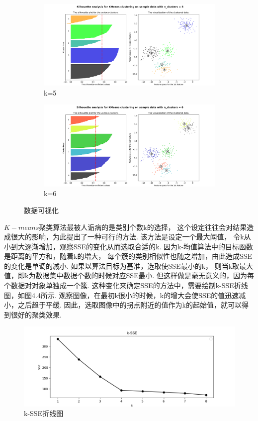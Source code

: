 \documentclass[bachelor,adobefonts]{jnuthesis}
\begin{document}
\begin{figure}[h!]
\begin{subfigure}[b]{0.4\linewidth}
    \includegraphics[width=\linewidth]{Wksh-5.png}
    \caption{k=5}
  \end{subfigure}
  \begin{subfigure}[b]{1.0\linewidth}
    \includegraphics[width=\linewidth]{Wksh-6.png}
    \caption{k=6}
  \end{subfigure}
  \caption{数据可视化}
\end{figure}

$K-means$聚类算法最被人诟病的是类别个数k的选择，
这个设定往往会对结果造成很大的影响，为此提出了一种可行的方法.
该方法是设定一个最大阈值，
令k从小到大逐渐增加，观察SSE的变化从而选取合适的k.
因为k-均值算法中的目标函数是距离的平方和，随着k的增大，
每个簇的类别相似性也随之增加，由此造成SSE的变化是单调的减小.
如果以算法目标为基准，选取使SSE最小的k，
则当k取最大值，即k为数据集中数据个数的时候对应SSE最小.
但这样做是毫无意义的，因为每个数据对对象单独成一个簇.
这种变化来确定SSE的方法中，需要绘制k-SSE折线图，如图4.4所示.
观察图像，在最初k很小的时候，k的增大会使SSE的值迅速减小，之后趋于平缓.
因此，选取图像中的拐点附近的值作为k的起始值，就可以得到很好的聚类效果.


\begin{figure}[h!]
  \centering
    \includegraphics[width=0.8\linewidth]{Wk-SSE.png}
  \caption{k-SSE折线图}
\end{figure}
\end{document}
